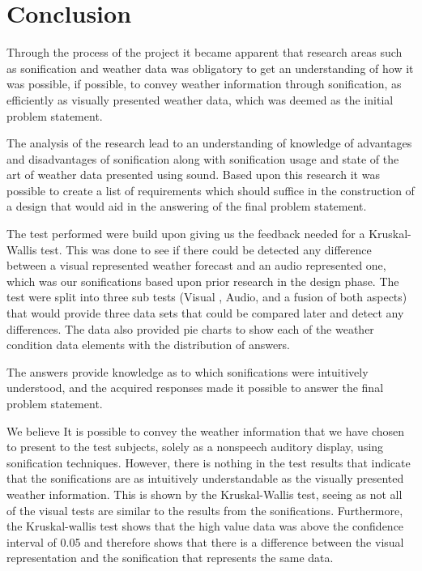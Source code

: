
\section{Conclusion} %
\label{sec:conclusion}

Through the process of the project it became apparent that research areas such as sonification and weather data was obligatory to get an understanding of how it was possible, if possible, to convey weather information through sonification, as efficiently as visually presented weather data, which was deemed as the initial problem statement. 

The analysis of the research lead to an understanding of knowledge of advantages and disadvantages of sonification along with sonification usage and state of the art of weather data presented using sound. 
Based upon this research it was possible to create a list of requirements which should suffice in the construction of a design that would aid in the answering of the final problem statement.

The test performed were build upon giving us the feedback needed for a Kruskal-Wallis test. 
This was done to see if there could be detected any difference between a visual represented weather forecast and an audio represented one, which was our sonifications based upon prior research in the design phase. 
The test were split into three sub tests (Visual , Audio, and a fusion of both aspects) that would provide three data sets that could be compared later and detect any differences. 
The data also provided pie charts to show each of the weather condition data elements with the distribution of answers.

The answers provide knowledge as to which sonifications were intuitively understood, and the acquired responses made it possible to answer the final problem statement.

We believe It is possible to convey the weather information that we have chosen to present to the test subjects, solely as a nonspeech auditory display, using sonification techniques.
However, there is nothing in the test results that indicate that the sonifications are as intuitively understandable as the visually presented weather information. 
This is shown by the Kruskal-Wallis test, seeing as not all of the visual tests are similar to the results from the sonifications. 
Furthermore, the Kruskal-wallis test shows that the high value data was above the confidence interval of 0.05 and therefore shows that there is a difference between the visual representation and the sonification that represents the same data.

